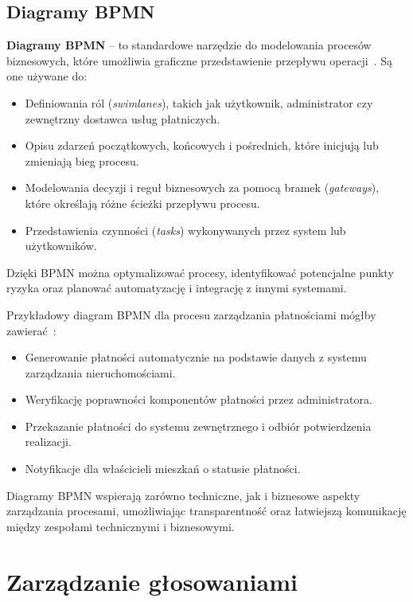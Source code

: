 \subsection{Diagramy BPMN}

\textbf{Diagramy BPMN} -- to standardowe narzędzie do modelowania procesów biznesowych, które umożliwia graficzne przedstawienie przepływu operacji~\cite{BPMN_wiki, BPMN_spec}. Są one używane do:
\begin{itemize}
    \item Definiowania ról (\emph{swimlanes}), takich jak użytkownik, administrator czy zewnętrzny dostawca usług płatniczych.
    \item Opisu zdarzeń początkowych, końcowych i pośrednich, które inicjują lub zmieniają bieg procesu.
    \item Modelowania decyzji i reguł biznesowych za pomocą bramek (\emph{gateways}), które określają różne ścieżki przepływu procesu.
    \item Przedstawienia czynności (\emph{tasks}) wykonywanych przez system lub użytkowników.
\end{itemize}

Dzięki BPMN można optymalizować procesy, identyfikować potencjalne punkty ryzyka oraz planować automatyzację i integrację z innymi systemami.

Przykładowy diagram BPMN dla procesu zarządzania płatnościami mógłby zawierać~\cite{BPMN_camunda}:
\begin{itemize}
    \item Generowanie płatności automatycznie na podstawie danych z systemu zarządzania nieruchomościami.
    \item Weryfikację poprawności komponentów płatności przez administratora.
    \item Przekazanie płatności do systemu zewnętrznego i odbiór potwierdzenia realizacji.
    \item Notyfikacje dla właścicieli mieszkań o statusie płatności.
\end{itemize}

Diagramy BPMN wspierają zarówno techniczne, jak i biznesowe aspekty zarządzania procesami, umożliwiając transparentność oraz łatwiejszą komunikację między zespołami technicznymi i biznesowymi.

\section{Zarządzanie głosowaniami}

